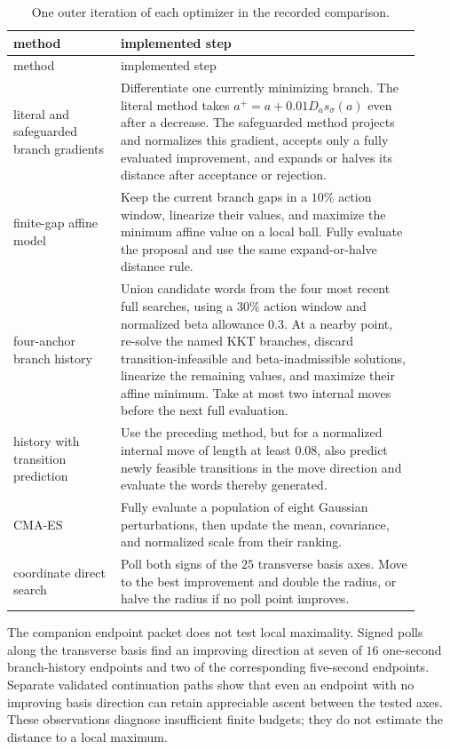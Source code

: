 \begingroup
\small
\begin{longtable}{@{}p{0.24\linewidth}p{0.67\linewidth}@{}}
\caption{One outer iteration of each optimizer in the recorded
comparison.}
\label{tab:black-box-datascience-f10-optimizer-steps}\\
\toprule
method & implemented step\\
\midrule
\endfirsthead
\toprule
method & implemented step\\
\midrule
\endhead
literal and safeguarded branch gradients
& Differentiate one currently minimizing branch.  The literal method takes
  \(a^+=a+0.01D_as_\sigma(a)\) even after a decrease.  The safeguarded method
  projects and normalizes this gradient, accepts only a fully evaluated
  improvement, and expands or halves its distance after acceptance or
  rejection.\\
finite-gap affine model
& Keep the current branch gaps in a \(10\%\) action window, linearize their
  values, and maximize the minimum affine value on a local ball.  Fully
  evaluate the proposal and use the same expand-or-halve distance rule.\\
four-anchor branch history
& Union candidate words from the four most recent full searches, using a
  \(30\%\) action window and normalized beta allowance \(0.3\).  At a nearby
  point, re-solve the named KKT branches, discard transition-infeasible and
  beta-inadmissible solutions, linearize the remaining values, and maximize
  their affine minimum.  Take at most two internal moves before the next full
  evaluation.\\
history with transition prediction
& Use the preceding method, but for a normalized internal move of length at
  least \(0.08\), also predict newly feasible transitions in the move
  direction and evaluate the words thereby generated.\\
CMA-ES
& Fully evaluate a population of eight Gaussian perturbations, then update
  the mean, covariance, and normalized scale from their ranking.\\
coordinate direct search
& Poll both signs of the \(25\) transverse basis axes.  Move to the best
  improvement and double the radius, or halve the radius if no poll point
  improves.\\
\bottomrule
\end{longtable}
\endgroup

The companion endpoint packet does not test local maximality.  Signed polls
along the transverse basis find an improving direction at seven of \(16\)
one-second branch-history endpoints and two of the corresponding five-second
endpoints.  Separate validated continuation paths show that even an endpoint
with no improving basis direction can retain appreciable ascent between the
tested axes.  These observations diagnose insufficient finite budgets; they
do not estimate the distance to a local maximum.

